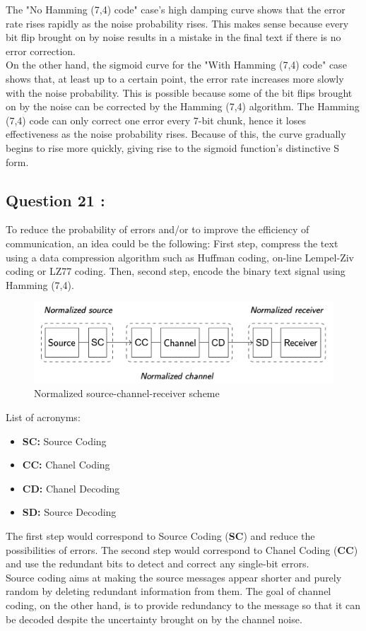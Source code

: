\documentclass[titlepage]{article}
\begin{document}
The "No Hamming (7,4) code" case's high damping curve shows that the error rate rises rapidly as the noise probability rises. This makes sense because every bit flip brought on by noise results in a mistake in the final text if there is no error correction.\\

On the other hand, the sigmoid curve for the "With Hamming (7,4) code" case shows that, at least up to a certain point, the error rate increases more slowly with the noise probability. This is possible because some of the bit flips brought on by the noise can be corrected by the Hamming (7,4) algorithm. The Hamming (7,4) code can only correct one error every 7-bit chunk, hence it loses effectiveness as the noise probability rises. Because of this, the curve gradually begins to rise more quickly, giving rise to the sigmoid function's distinctive S form.

\subsection{Question 21 : } 

To reduce the probability of errors and/or to improve the efficiency of communication, an idea could be the following: First step, compress the text using a data compression algorithm such as Huffman coding, on-line Lempel-Ziv coding or LZ77 coding. Then, second step, encode the binary text signal using Hamming (7,4).

\begin{figure}[H]
  \centering
  \includegraphics[scale=0.5]{q21.png}
  \caption{Normalized source-channel-receiver scheme}
  \label{fig:q20}
\end{figure}

List of acronyms:
\begin{itemize}
    \item \textbf{SC:} Source Coding
    \item \textbf{CC:} Chanel Coding
    \item \textbf{CD:} Chanel Decoding
    \item \textbf{SD:} Source Decoding
\end{itemize}

The first step would correspond to Source Coding (\textbf{SC}) and reduce the possibilities of errors. The second step would correspond to Chanel Coding (\textbf{CC}) and use the redundant bits to detect and correct any single-bit errors.\\

Source coding aims at making the source messages appear shorter and purely random by deleting redundant information from them. The goal of channel coding, on the other hand, is to provide redundancy to the message so that it can be decoded despite the uncertainty brought on by the channel noise.
\end{document}
